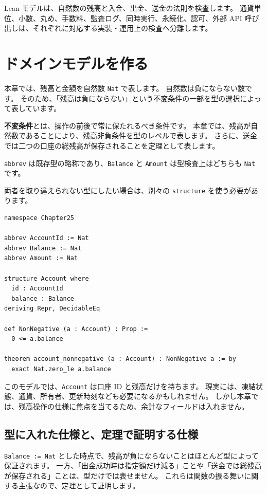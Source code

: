 Lean モデルは、自然数の残高と入金、出金、送金の法則を検査します。
通貨単位、小数、丸め、手数料、監査ログ、同時実行、永続化、認可、外部 API 呼び出しは、それぞれに対応する実装・運用上の検査へ分離します。

\section{ドメインモデルを作る}

本章では、残高と金額を自然数 \texttt{Nat} で表します。
自然数は負にならない数です。
そのため、「残高は負にならない」という不変条件の一部を型の選択によって表しています。

\textbf{不変条件}とは、操作の前後で常に保たれるべき条件です。
本章では、残高が自然数であることにより、残高非負条件を型のレベルで表します。
さらに、送金では二つの口座の総残高が保存されることを定理として表します。

\texttt{abbrev} は既存型の略称であり、\texttt{Balance} と \texttt{Amount} は型検査上はどちらも \texttt{Nat} です。

両者を取り違えられない型にしたい場合は、別々の \texttt{structure} を使う必要があります。

\begin{listing}[htbp]
\begin{verbatim}
namespace Chapter25

abbrev AccountId := Nat
abbrev Balance := Nat
abbrev Amount := Nat

structure Account where
  id : AccountId
  balance : Balance
deriving Repr, DecidableEq

def NonNegative (a : Account) : Prop :=
  0 <= a.balance

theorem account_nonnegative (a : Account) : NonNegative a := by
  exact Nat.zero_le a.balance
\end{verbatim}
\caption{\texttt{Account} と \texttt{NonNegative}}
\label{lst:ch25-domain-model}
\end{listing}

このモデルでは、\texttt{Account} は口座 ID と残高だけを持ちます。
現実には、凍結状態、通貨、所有者、更新時刻なども必要になるかもしれません。
しかし本章では、残高操作の仕様に焦点を当てるため、余計なフィールドは入れません。

\subsection{型に入れた仕様と、定理で証明する仕様}

\texttt{Balance := Nat} とした時点で、残高が負にならないことはほとんど型によって保証されます。
一方、「出金成功時は指定額だけ減る」ことや「送金では総残高が保存される」ことは、型だけでは表せません。
これらは関数の振る舞いに関する主張なので、定理として証明します。

